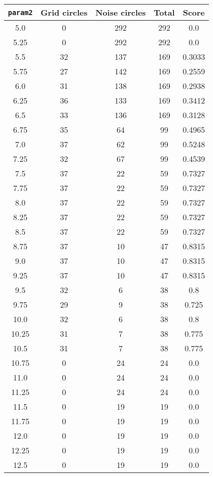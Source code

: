 \documentclass[letterpaper, 12pt]{article}
\begin{document}
\begin{longtable}{|c|c|c|c|c|}
\hline
\textbf{\texttt{param2}} & \textbf{Grid circles} & \textbf{Noise circles} & \textbf{Total} & \textbf{Score} \\
\hline
5.0 & 0 & 292 & 292 & 0.0 \\
\hline
5.25 & 0 & 292 & 292 & 0.0 \\
\hline
5.5 & 32 & 137 & 169 & 0.3033 \\
\hline
5.75 & 27 & 142 & 169 & 0.2559 \\
\hline
6.0 & 31 & 138 & 169 & 0.2938 \\
\hline
6.25 & 36 & 133 & 169 & 0.3412 \\
\hline
6.5 & 33 & 136 & 169 & 0.3128 \\
\hline
6.75 & 35 & 64 & 99 & 0.4965 \\
\hline
7.0 & 37 & 62 & 99 & 0.5248 \\
\hline
7.25 & 32 & 67 & 99 & 0.4539 \\
\hline
7.5 & 37 & 22 & 59 & 0.7327 \\
\hline
7.75 & 37 & 22 & 59 & 0.7327 \\
\hline
8.0 & 37 & 22 & 59 & 0.7327 \\
\hline
8.25 & 37 & 22 & 59 & 0.7327 \\
\hline
8.5 & 37 & 22 & 59 & 0.7327 \\
\hline
8.75 & 37 & 10 & 47 & 0.8315 \\
\hline
9.0 & 37 & 10 & 47 & 0.8315 \\
\hline
9.25 & 37 & 10 & 47 & 0.8315 \\
\hline
9.5 & 32 & 6 & 38 & 0.8 \\
\hline
9.75 & 29 & 9 & 38 & 0.725 \\
\hline
10.0 & 32 & 6 & 38 & 0.8 \\
\hline
10.25 & 31 & 7 & 38 & 0.775 \\
\hline
10.5 & 31 & 7 & 38 & 0.775 \\
\hline
10.75 & 0 & 24 & 24 & 0.0 \\
\hline
11.0 & 0 & 24 & 24 & 0.0 \\
\hline
11.25 & 0 & 24 & 24 & 0.0 \\
\hline
11.5 & 0 & 19 & 19 & 0.0 \\
\hline
11.75 & 0 & 19 & 19 & 0.0 \\
\hline
12.0 & 0 & 19 & 19 & 0.0 \\
\hline
12.25 & 0 & 19 & 19 & 0.0 \\
\hline
12.5 & 0 & 19 & 19 & 0.0 \\

\end{longtable}
\end{document}
